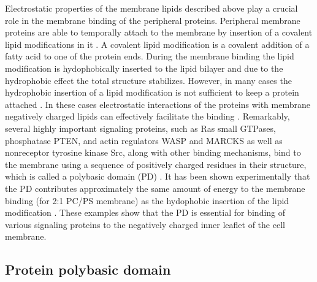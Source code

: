 \label{adsorption_introduction0}

Electrostatic properties of the membrane lipids described above play a crucial role in the membrane binding of the peripheral proteins. Peripheral membrane proteins are able to temporally attach to the membrane by insertion of a covalent lipid modifications in it \cite{Fivaz2003}. A covalent lipid modification is a covalent addition of a fatty acid to one of the protein ends. During the membrane binding the lipid modification is hydophobically inserted to the lipid bilayer and due to the hydrophobic effect the total structure stabilizes. However, in many cases the hydrophobic insertion of a lipid modification is not sufficient to keep a protein attached \cite{McLaughlin1995}. In these cases electrostatic interactions of the proteins with membrane negatively charged lipids can effectively facilitate the binding \cite{Wang2001,Arbuzova2000}. Remarkably, several highly important signaling proteins, such as Ras small GTPases, phosphatase PTEN, and actin regulators WASP and MARCKS as well as nonreceptor tyrosine kinase Src, along with other binding mechanisms, bind to the membrane using a sequence of positively charged residues in their structure, which is called a polybasic domain (PD) \cite{Hancock1990,Murray1998,Fivaz2003,McLaughlin1995,Wang2002,Das2003}. It has been shown experimentally that the PD contributes approximately the same amount of energy to the membrane binding (for 2:1 PC/PS membrane) as the hydophobic insertion of the lipid modification \cite{McLaughlin1995}. These examples show that the PD is essential for binding of various signaling proteins to the negatively charged inner leaflet of the cell membrane.

\subsection{Protein polybasic domain}

\label{proteins_polybasic_domain}

